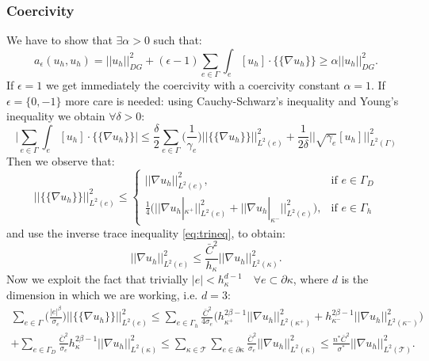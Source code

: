 \documentclass[12pt, a4paper]{article}
\theoremstyle{definition}
\theoremstyle{plain}
\theoremstyle{plain}
\theoremstyle{definition}
\begin{document}
\subsubsection{Coercivity}
We have to show that $\exists \alpha > 0 $ such that:
\begin{equation*}
a_\epsilon(u_h, u_h) = |\!|u_h|\!|^2_{DG} + (\epsilon - 1) \sum_{e \in \Gamma} \int_e [u_h] \cdot \{\!\!\{ \nabla u_h \}\!\!\} \geq \alpha |\!|u_h|\!|^2_{DG}.
\end{equation*}
If $\epsilon = 1$ we get immediately the coercivity with a coercivity constant $\alpha = 1$.
If $\epsilon = \{0,-1\}$ more care is needed: using Cauchy-Schwarz's inequality 
and Young's inequality we obtain $\forall \delta > 0$:
\begin{equation} \label{pas:young}
\bigg| \sum_{e \in \Gamma} \int_e [u_h] \cdot \{\!\!\{ \nabla u_h \}\!\!\} \bigg| \leq
\frac{\delta}{2} \sum_{e \in \Gamma} \bigg( \frac{1}{\gamma_e} \bigg)  \big|\!\big| \{\!\!\{ \nabla u_h \}\!\!\} \big|\!\big|^2_{L^2(e)}
+ \frac{1}{2\delta} \bigg|\!\bigg| \sqrt{\gamma_e} [u_h] \bigg|\!\bigg|^2_{L^2(\Gamma)}
\end{equation}
Then we observe that:
\begin{equation*}
\big|\!\big| \{\!\!\{ \nabla u_h \}\!\!\} \big|\!\big|^2_{L^2(e)} \leq
\begin{cases}
\big|\!\big| \nabla u_h \big|\!\big|^2_{L^2(e)}, & \text{if } e \in \Gamma_D\\
\frac{1}{4} \big( \big|\!\big| \nabla u_h|_{\kappa^+} \big|\!\big|^2_{L^2(e)} + \big|\!\big| \nabla u_h|_{\kappa^-} \big|\!\big|^2_{L^2(e)} \big), & \text{if } e \in \Gamma_h
\end{cases}
\end{equation*}
and use the inverse trace inequality \eqref{eq:trineq}, to obtain:
\begin{equation*}
\big|\!\big| \nabla u_h \big|\!\big|^2_{L^2(e)} \leq \frac{\bar{C}^2}{h_\kappa} \big|\!\big| \nabla u_h \big|\!\big|^2_{L^2(\kappa)}.
\end{equation*}
Now we exploit the fact that trivially $|e| < h_\kappa^{d-1} \quad \forall e 
\subset \partial \kappa$, where $d$ is the dimension in which we are working, 
i.e. $d = 3$:
\begin{multline} \label{pas:invineq}
\sum_{e \in \Gamma} \bigg( \frac{|e|^\beta}{\sigma_e} \bigg)  \big|\!\big| \{\!\!\{ \nabla u_h \}\!\!\} \big|\!\big|^2_{L^2(e)}
\leq \sum_{e \in \Gamma_h} \frac{\bar{C}^2}{4\sigma_e} \bigg( h_{\kappa^+}^{2\beta - 1} \big|\!\big| \nabla u_h \big|\!\big|^2_{L^2(\kappa^+)} + h_{\kappa^-}^{2\beta - 1} \big|\!\big| \nabla u_h \big|\!\big|^2_{L^2(\kappa^-)} \bigg)\\
+ \sum_{e \in \Gamma_D} \frac{\bar{C}^2}{\sigma_e} h_\kappa^{2\beta - 1} \big|\!\big| \nabla u_h \big|\!\big|^2_{L^2(\kappa)}
\leq \sum_{\kappa \in \mathcal{T}} \sum_{e \in \partial \kappa} \frac{\bar{C}^2}{\sigma_e} \big|\!\big| \nabla u_h \big|\!\big|^2_{L^2(\kappa)}
\leq \frac{n^*\bar{C}^2}{\sigma^*} \big|\!\big| \nabla u_h \big|\!\big|^2_{L^2(\mathcal{T})}.
\end{multline}
\end{document}
